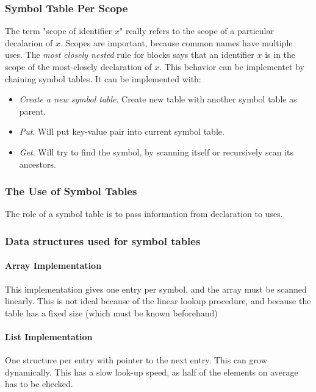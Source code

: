 \documentclass{article}
\begin{document}
\subsubsection{Symbol Table Per Scope} %
\label{ssub:Symbol Table Per Scope}
The term "scope of identifier $x$" really refers to the scope of a particular decalarion of $x$. Scopes are important, because common names have multiple uses. The \emph{most closely nested} rule for blocks says that an identifier $x$ is in the scope of the most-closely declaration of $x$. This behavior can be implementet by chaining symbol tables. It can be implemented with:
\begin{itemize}
	\item \emph{Create a new symbol table}. Create new table with another symbol table as parent.
	\item \emph{Put}. Will put key-value pair into current symbol table.
	\item \emph{Get}. Will try to find the symbol, by scanning itself or recursively scan its ancestors.
\end{itemize}

\subsubsection{The Use of Symbol Tables} %
\label{ssub:The Use of Symbol Tables}
The role of a symbol table is to pass information from declaration to uses.

\subsubsection{Data structures used for symbol tables} %
\label{ssub:datastructures for symboltables}

\paragraph{Array Implementation}
This implementation gives one entry per symbol, and the array must be scanned linearly. This is not ideal because of the linear lookup procedure, and because the table has a fixed size (which must be known beforehand)

\paragraph{List Implementation}
One structure per entry with pointer to the next entry. This can grow dynamically. This has a slow look-up speed, as half of the elements on average has to be checked.
\end{document}
